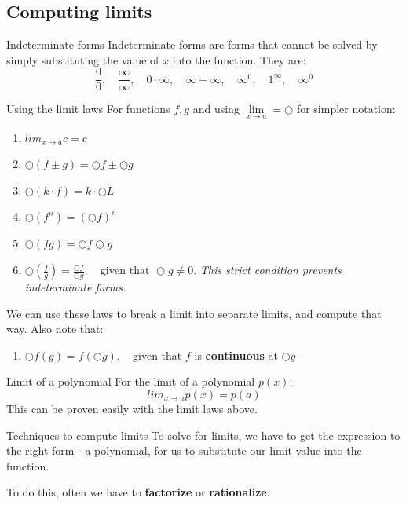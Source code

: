\documentclass{article}
\begin{document}
\subsection{Computing limits}
\label{sec:indeterminate}
\begin{definition}
    {Indeterminate forms}
    Indeterminate forms are forms that cannot be solved by simply substituting the value of $x$ into the function. They are:
    \[\frac{0}{0},\quad\frac{\infty}{\infty},\quad0\cdot\infty,\quad\infty-\infty,\quad\infty^0,\quad1^\infty,\quad\infty^0\]
\end{definition}
\begin{theorem}
    {Using the limit laws}
    For functions $f,g$ and using $\mathop {\lim }\limits_{x \to a}=\bigcirc$ for simpler notation:
    \begin{enumerate}
        \item $lim_{x\to a}c=c$
        \item $\bigcirc(f\pm g)=\bigcirc f\pm \bigcirc g$
        \item $\bigcirc(k\cdot f)=k\cdot\bigcirc L$
        \item $\bigcirc(f^n)=(\bigcirc f)^n$
        \item $\bigcirc(fg)=\bigcirc f\bigcirc g$
        \item $\bigcirc(\frac{f}{g})=\frac{\bigcirc f}{\bigcirc g},\quad\text{given that }\bigcirc g\ne 0$. \emph{This strict condition prevents indeterminate forms.}
    \end{enumerate}
    We can use these laws to break a limit into separate limits, and compute that way. Also note that:
    \begin{enumerate}[start=7]
        \item $\bigcirc f(g)=f(\bigcirc g),\quad$given that $f$ is \textbf{continuous} at $\bigcirc g$
    \end{enumerate}
\end{theorem}
\begin{theorem}
    {Limit of a polynomial}
    For the limit of a polynomial $p(x)$:
    \[lim_{x\to a}p(x)=p(a)\]
    This can be proven easily with the limit laws above.
\end{theorem}
\begin{knBox}
    {Techniques to compute limits}
    To solve for limits, we have to get the expression to the right form - a polynomial, for us to substitute our limit value into the function.

    To do this, often we have to \textbf{factorize} or \textbf{rationalize}.
\end{knBox}
\end{document}
